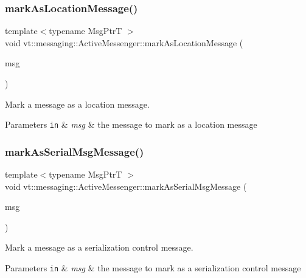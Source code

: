 \subsubsection{\texorpdfstring{mark\+As\+Location\+Message()}{markAsLocationMessage()}}
{\footnotesize\ttfamily template$<$typename Msg\+PtrT $>$ \\
void vt\+::messaging\+::\+Active\+Messenger\+::mark\+As\+Location\+Message (\begin{DoxyParamCaption}\item[{Msg\+PtrT const}]{msg }\end{DoxyParamCaption})}



Mark a message as a location message. 


\begin{DoxyParams}[1]{Parameters}
\mbox{\tt in}  & {\em msg} & the message to mark as a location message \\
\hline
\end{DoxyParams}
\mbox{\label{structvt_1_1messaging_1_1_active_messenger_ae4f8d48cda11b13d4447ab253ff18bf2}} 
\subsubsection{\texorpdfstring{mark\+As\+Serial\+Msg\+Message()}{markAsSerialMsgMessage()}}
{\footnotesize\ttfamily template$<$typename Msg\+PtrT $>$ \\
void vt\+::messaging\+::\+Active\+Messenger\+::mark\+As\+Serial\+Msg\+Message (\begin{DoxyParamCaption}\item[{Msg\+PtrT const}]{msg }\end{DoxyParamCaption})}



Mark a message as a serialization control message. 


\begin{DoxyParams}[1]{Parameters}
\mbox{\tt in}  & {\em msg} & the message to mark as a serialization control message \\
\hline
\end{DoxyParams}
\mbox{\label{structvt_1_1messaging_1_1_active_messenger_ad76f4f0ee9830f4431b57720163f715c}} 
